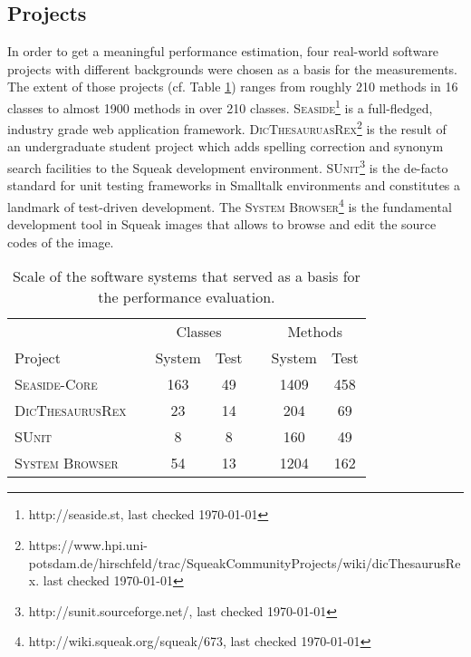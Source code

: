 \subsection{Projects}
\label{ss:DiscussionProjects}
In order to get a meaningful performance estimation, four real-world software projects with different backgrounds were chosen as a basis for the measurements.
The extent of those projects (cf. Table \ref{t:EvaluationProjects}) ranges from roughly 210 methods in 16 classes to almost 1900 methods in over 210 classes.
\textsc{Seaside}\footnote{http://seaside.st, last checked \today} is a full-fledged, industry grade web application framework.
\textsc{DicThesauruasRex}\footnote{https://www.hpi.uni-potsdam.de/hirschfeld/trac/SqueakCommunityProjects/wiki/dicThesaurusRex. last checked \today} is the result of an undergraduate student project which adds spelling correction and synonym search facilities to the Squeak development environment.
\textsc{SUnit}\footnote{http://sunit.sourceforge.net/, last checked \today} is the de-facto standard for unit testing frameworks in Smalltalk environments and constitutes a landmark of test-driven development.
The \textsc{System Browser}\footnote{http://wiki.squeak.org/squeak/673, last checked \today} is the fundamental development tool in Squeak images that allows to browse and edit the source codes of the image.

\begin{table}
\centering
\begin{tabular}{lcccccc}
\toprule[1.5pt]
\phantom{abc} & \phantom{abc} & \multicolumn{2}{c}{Classes} & \phantom{abc} & \multicolumn{2}{c}{Methods}  \\
\cmidrule{3-4} \cmidrule{6-7}
Project    && System & Test && System & Test \\
\midrule
\textsc{Seaside-Core}		&&	163	&	49	&&	1409	&	458	\\
\textsc{DicThesaurusRex}	&&	23	&	14	&&	204		&	69	\\
\textsc{SUnit}				&&	8	&	8	&&	160		&	49	\\
\textsc{System Browser}		&&	54	&	13	&&	1204	&	162	\\
\bottomrule[1.5pt]
\end{tabular}
\caption[Test Subjects]{Scale of the software systems that served as a basis for the performance evaluation.}
\label{t:EvaluationProjects}
\end{table}

